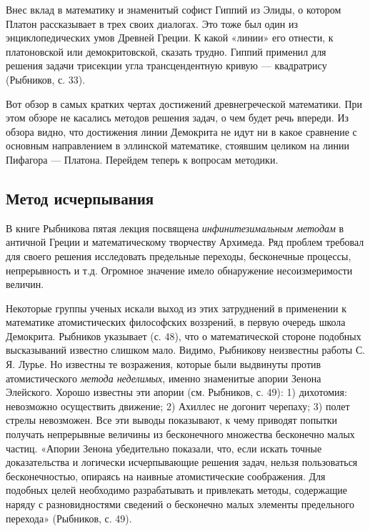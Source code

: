 Внес вклад в математику и знаменитый софист Гиппий из Элиды, о котором
Платон  рассказывает в  трех  своих  диалогах. Это  тоже  был один  из
энциклопедических умов Древней Греции. К  какой «линии» его отнести, к
платоновской или  демокритовской, сказать трудно. Гиппий  применил для
решения задачи  трисекции угла трансцендентную кривую  --- квадратрису
(Рыбников, с. 33).

Вот   обзор  в   самых  кратких   чертах  достижений   древнегреческой
математики. При этом  обзоре не касались методов решения  задач, о чем
будет речь впереди. Из обзора видно, что достижения линии Демокрита не
идут  ни  в  какое  сравнение  с  основным  направлением  в  эллинской
математике, стоявшим  целиком на линии Пифагора  --- Платона. Перейдем
теперь к вопросам методики.

\subsection{Метод исчерпывания}

В  книге  Рыбникова  пятая  лекция  посвящена  \emph{инфинитезимальным
методам} в античной Греции  и математическому творчеству Архимеда. Ряд
проблем требовал  для своего решения исследовать  предельные переходы,
бесконечные  процессы, непрерывность  и т.д.  Огромное значение  имело
обнаружение несоизмеримости величин.

Некоторые группы ученых искали выход  из этих затруднений в применении
к математике  атомистических философских  воззрений, в  первую очередь
школа  Демокрита. Рыбников  указывает  (с. 48),  что о  математической
стороне подобных высказываний известно слишком мало. Видимо, Рыбникову
неизвестны  работы С.  Я. Лурье.  Но известны  те возражения,  которые
были выдвинуты против  атомистического \emph{метода неделимых}, именно
знаменитые апории  Зенона Элейского.  Хорошо известны эти  апории (см.
Рыбников, с.  49): 1)  дихотомия: невозможно осуществить  движение; 2)
Ахиллес  не догонит  черепаху;  3) полет  стрелы  невозможен. Все  эти
выводы  показывают,  к  чему  приводят  попытки  получать  непрерывные
величины из  бесконечного множества  бесконечно малых  частиц. «Апории
Зенона убедительно  показали, что,  если искать  точные доказательства
и   логически  исчерпывающие   решения   задач,  нельзя   пользоваться
бесконечностью,  опираясь   на  наивные   атомистические  соображения.
Для  подобных  целей  необходимо разрабатывать  и  привлекать  методы,
содержащие  наряду  с  разновидностями  сведений  о  бесконечно  малых
элементы предельного перехода» (Рыбников, с. 49).

